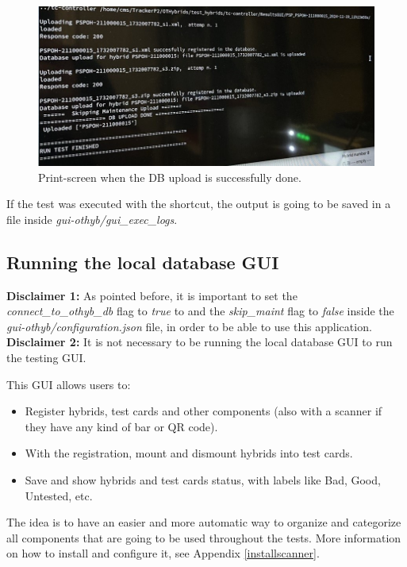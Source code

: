 \documentclass[10pt,a4paper]{article}
\begin{document}
\begin{figure}[h!]
\centering
 \includegraphics[width=1.0\linewidth]{Pictures/DBupload-success.jpg} 
  \caption{Print-screen when the DB upload is successfully done.}
  \label{DBupload}
\end{figure}

If the test was executed with the shortcut, the output is going to be saved in a file inside \emph{gui-othyb/gui\_exec\_logs}.

\subsection{Running the local database GUI}
\label{scanner}

\textbf{Disclaimer 1:} As pointed before, it is important to set the \emph{connect\_to\_othyb\_db} flag to \emph{true} to and the \emph{skip\_maint} flag to \emph{false} inside the \emph{gui-othyb/configuration.json} file, in order to be able to use this application.
\textbf{Disclaimer 2:} It is not necessary to be running the local database GUI to run the testing GUI. 

This GUI allows users to: 

\begin{itemize}
    \item Register hybrids, test cards and other components (also with a scanner if they have any kind of bar or QR code).
    \item With the registration, mount and dismount hybrids into test cards.
    \item Save and show hybrids and test cards status, with labels like Bad, Good, Untested, etc.
\end{itemize}

The idea is to have an easier and more automatic way to organize and categorize all components that are going to be used throughout the tests. More information on how to install and configure it, see Appendix \ref{installscanner}.
\end{document}

